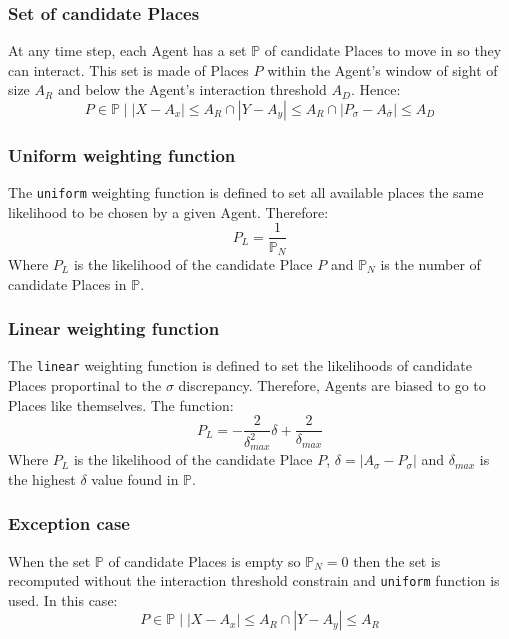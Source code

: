 \documentclass{article}
\begin{document}
\subsubsection{Set of candidate Places}

\par At any time step, each Agent has a set $\mathbb{P}$ of candidate Places to move in so they can interact. This set is made of Places $P$ within the Agent's window of sight of size $A_{R}$ and below the Agent's interaction threshold $A_{D}$. Hence:
\begin{equation}
    P \in \mathbb{P} \;\big|\;|X - A_{x}| \leq A_{R} \cap |Y - A_{y}| \leq A_{R} \cap |P_{\sigma} - A_{\bar{\sigma}}| \leq A_{D} 
\end{equation}

\subsubsection{Uniform weighting function}

\par The \texttt{uniform} weighting function is defined to set all available places the same likelihood to be chosen by a given Agent. Therefore:
\begin{equation}
    P_L = \frac{1}{{\mathbb{P}_N}} 
\end{equation}
Where $P_L$ is the likelihood of the candidate Place $P$ and ${\mathbb{P}_N}$ is the number of candidate Places in $\mathbb{P}$.

\subsubsection{Linear weighting function}

\par \par The \texttt{linear} weighting function is defined to set the likelihoods of candidate Places proportinal to the $\sigma$ discrepancy. Therefore, Agents are biased to go to Places like themselves. The function:
\begin{equation}
     P_L = -\frac{2}{\delta_{max}^2} \delta + \frac{2}{\delta_{max}}
\end{equation}
Where $P_L$ is the likelihood of the candidate Place $P$, $\delta = |A_{\sigma} - P_{\sigma}|$ and $\delta_{max}$ is the highest $\delta$ value found in $\mathbb{P}$.

\subsubsection{Exception case}

\par When the set $\mathbb{P}$ of candidate Places is empty so ${\mathbb{P}}_N = 0$ then the set is recomputed without the interaction threshold constrain and \texttt{uniform} function is used. In this case:
\begin{equation}
    P \in \mathbb{P} \;\big|\;|X - A_{x}| \leq A_{R} \cap |Y - A_{y}| \leq A_{R} 
\end{equation}
\end{document}
